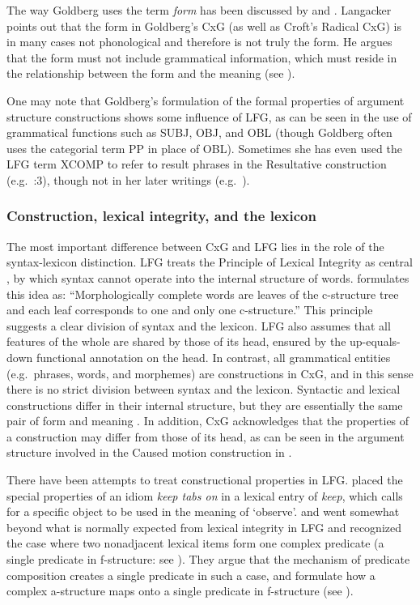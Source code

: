 \documentclass[output=paper,japanesefont,hidelinks]{langscibook}
\begin{document}
The way Goldberg uses the term \textit{form} has been discussed by \citet{Langacker2005} and \citet{Verhagen2009}. Langacker points out that the form in Goldberg's CxG (as well as Croft's Radical CxG) is in many cases not phonological and therefore is not truly the form. He argues that the form must not include grammatical information, which must reside in the relationship between the form and the meaning (see ). 

One may note that Goldberg's formulation of the formal properties of argument structure constructions shows some influence of LFG, as can be seen in the use of grammatical functions such as SUBJ, OBJ, and OBL (though Goldberg often uses the categorial term PP in place of OBL). Sometimes she has even used the LFG term XCOMP to refer to result phrases in the Resultative construction (e.g.\ \citealt{goldberg1995constructions}:3), though not in her later writings (e.g.\ \citealt{Goldberg2006}). 

\subsubsection{Construction, lexical integrity, and the lexicon}
\label{sec:cg:2.2.2}

The most important difference between CxG and LFG lies in the role of the syntax-lexicon distinction. LFG treats the Principle of Lexical Integrity as central \citep{bresnan1995the-lexical,bresnan2001lexical}, by which syntax cannot operate into the internal structure of words. \citet[91]{bresnan2001lexical} formulates this idea as: ``Morphologically complete words are leaves of the c-structure tree and each leaf corresponds to one and only one c-structure.'' This principle suggests a clear division of syntax and the lexicon. LFG also assumes that all features of the whole are shared by those of its head, ensured by the up-equals-down functional annotation on the head. In contrast, all grammatical entities (e.g.\ phrases, words, and morphemes) are constructions in CxG, and in this sense there is no strict division between syntax and the lexicon. Syntactic and lexical constructions differ in their internal structure, but they are essentially the same pair of form and meaning \citep[7]{goldberg1995constructions}. In addition, CxG acknowledges that the properties of a construction may differ from those of its head, as can be seen in the argument structure involved in the Caused motion construction in .

There have been attempts to treat constructional properties in LFG. \citet{kaplanbresnan82} placed the special properties of an idiom \textit{keep tabs on} in a lexical entry of \textit{keep}, which calls for a specific object to be used in the meaning of ‘observe'. \citet{alsina1996the-role} and \citet{Butt1995} went somewhat beyond what is normally expected from lexical integrity in LFG and recognized the case where two nonadjacent lexical items form one complex predicate (a single predicate in f-structure: see ). They argue that the mechanism of predicate composition creates a single predicate in such a case, and formulate how a complex a-structure maps onto a single predicate in f-structure (see ). 
\end{document}
